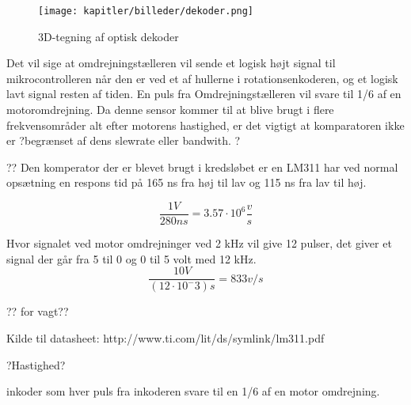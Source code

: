 \begin{figure}[ht]
    \centering
    \texttt{[image: kapitler/billeder/dekoder.png]}
    \caption{3D-tegning af optisk dekoder}
    \label{fig:dekoder}
\end{figure}


Det vil sige at omdrejningstælleren vil sende et logisk højt signal til mikrocontrolleren når den er ved et af hullerne i  rotationsenkoderen, og et logisk lavt signal resten af tiden. En puls fra Omdrejningstælleren vil svare til 1/6 af en motoromdrejning.
Da denne sensor kommer til at blive brugt i flere frekvensområder alt efter motorens hastighed, er det vigtigt at komparatoren ikke er ?begrænset af dens slewrate eller bandwith. ? 


??
Den komperator der er blevet brugt i kredsløbet er en LM311 har ved normal opsætning en respons tid på 165 ns fra høj til lav og 115 ns fra lav til høj.

\begin{equation}
\frac{1 V}{280 ns} = 3.57\cdot 10^6 \frac{v}{s}
\end{equation}

Hvor signalet ved motor omdrejninger ved 2 kHz vil give 12 pulser, det giver et signal der går fra 5 til 0 og 0 til 5 volt med 12 kHz.
\begin{equation}
\frac{10 V}{(12 \cdot 10^-3)s} = 833 v/s
\end{equation}


?? for vagt?? 



Kilde til datasheet: http://www.ti.com/lit/ds/symlink/lm311.pdf


?Hastighed?

inkoder som hver puls fra inkoderen svare til en 1/6 af en motor omdrejning. 